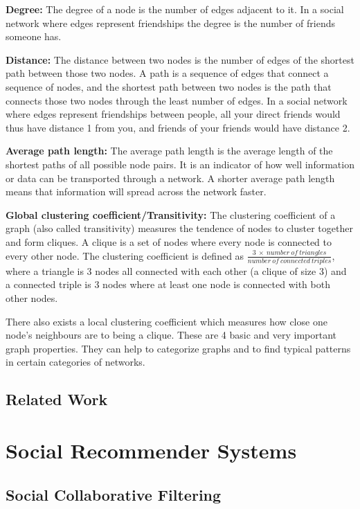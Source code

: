 \textbf{Degree:} The degree of a node is the number of edges adjacent to it. In a social network where edges represent friendships the degree is the number of friends someone has.

\textbf{Distance:} The distance between two nodes is the number of edges of the shortest path between those two nodes. A path is a sequence of edges that connect a sequence of nodes, and the shortest path between two nodes is the path that connects those two nodes through the least number of edges. In a social network where edges represent friendships between people, all your direct friends would thus have distance 1 from you, and friends of your friends would have distance 2.

\textbf{Average path length:} The average path length is the average length of the shortest paths of all possible node pairs. It is an indicator of how well information or data can be transported through a network. A shorter average path length means that information will spread across the network faster.

\textbf{Global clustering coefficient/Transitivity:} The clustering coefficient of a graph (also called transitivity) measures the tendence of nodes to cluster together and form cliques. A clique is a set of nodes where every node is connected to every other node. The clustering coefficient is defined as $\frac{3\:\times\:number\:of\:triangles}{number\:of\:connected\:triples}$, where a triangle is 3 nodes all connected with each other (a clique of size 3) and a connected triple is 3 nodes where at least one node is connected with both other nodes.

There also exists a local clustering coefficient which measures how close one node's neighbours are to being a clique.
\newline
\newline
These are 4 basic and very important graph properties. They can help to categorize graphs and to find typical patterns in certain categories of networks. 

\subsection{Related Work}
\label{sst:snrelatedwork}

\section{Social Recommender Systems}
\label{st:socialrecommendersystems}

\subsection{Social Collaborative Filtering}
\label{sst:socialcf}